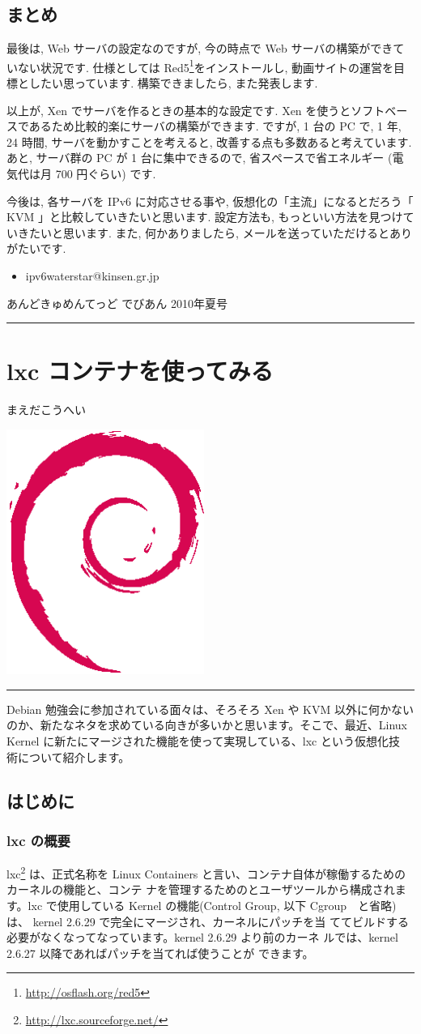 \documentclass[mingoth,a4paper]{jsarticle}
\renewcommand{\dancersection}[2]{%
\newpage
あんどきゅめんてっど でびあん 2010年夏号
%
\vspace{0.1mm}\\
{\color{dancerlightblue}\rule{\hsize}{2mm}}

%
%
\begin{minipage}[t]{0.6\hsize}
\color{dancerdarkblue}
\vspace{1cm}
\section{#1}
\hfill{}#2\\
\end{minipage}
\begin{minipage}[t]{0.4\hsize}
\vspace{-2cm}
\hfill{}\includegraphics[height=8cm]{image200502/openlogo-nd.eps}\\
\vspace{-5cm}
\end{minipage}
%
%
{\color{dancerdarkblue}\rule{0.74\hsize}{2mm}}
%
\vspace{2cm}
}
\begin{document}
\subsection{まとめ}
最後は, Web サーバの設定なのですが, 今の時点で Web サーバの構築ができていない状況です. 仕様としては Red5\footnote{\url{http://osflash.org/red5}}をインストールし, 動画サイトの運営を目標としたい思っています. 構築できましたら, また発表します.

以上が, Xen でサーバを作るときの基本的な設定です. Xen を使うとソフトベースであるため比較的楽にサーバの構築ができます. ですが, 1 台の PC で, 1 年, 24 時間, サーバを動かすことを考えると, 改善する点も多数あると考えています. あと, サーバ群の PC が 1 台に集中できるので, 省スペースで省エネルギー (電気代は月 700 円ぐらい) です.

今後は, 各サーバを IPv6 に対応させる事や, 仮想化の「主流」になるとだろう「 KVM 」と比較していきたいと思います. 設定方法も, もっといい方法を見つけていきたいと思います. また, 何かありましたら, メールを送っていただけるとありがたいです.

\begin{itemize}
\item ipv6waterstar@kinsen.gr.jp
\end{itemize}

\dancersection{lxc コンテナを使ってみる }{まえだこうへい}
\label{sec:lxc}

Debian 勉強会に参加されている面々は、そろそろ Xen や KVM 以外に何かない
のか、新たなネタを求めている向きが多いかと思います。そこで、最近、Linux
Kernel に新たにマージされた機能を使って実現している、lxc という仮想化技
術について紹介します。

\subsection{はじめに}
\subsubsection{lxc の概要}
lxc\footnote{\url{http://lxc.sourceforge.net/}} は、正式名称を Linux
Containers と言い、コンテナ自体が稼働するためのカーネルの機能と、コンテ
ナを管理するためのとユーザツールから構成されます。lxc で使用している
Kernel の機能(Control Group, 以下 Cgroup　と省略)は、
kernel 2.6.29 で完全にマージされ、カーネルにパッチを当
ててビルドする必要がなくなってなっています。kernel 2.6.29 より前のカーネ
ルでは、kernel 2.6.27 以降であればパッチを当てれば使うことが
できます。
\end{document}
